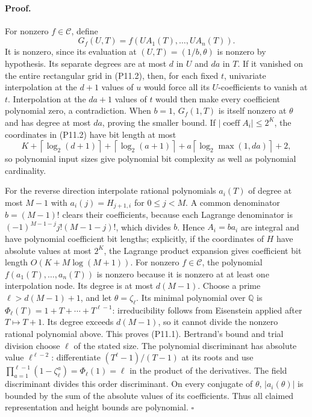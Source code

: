 \documentclass[11pt,a4paper]{article}
\theoremstyle{definition}\newtheorem{definition}{Definition}
\begin{document}
\paragraph{Proof.}
For nonzero $f\in\mathcal C$, define
\[
 G_f(U,T)=f(UA_1(T),\ldots,UA_n(T)).
\]
It is nonzero, since its evaluation at $(U,T)=(1/b,\theta)$ is nonzero by hypothesis. Its separate degrees are at most $d$ in $U$ and $da$ in $T$. If it vanished on the entire rectangular grid in (P11.2), then, for each fixed $t$, univariate interpolation at the $d+1$ values of $u$ would force all its $U$-coefficients to vanish at $t$. Interpolation at the $da+1$ values of $t$ would then make every coefficient polynomial zero, a contradiction. When $b=1$, $G_f(1,T)$ is itself nonzero at $\theta$ and has degree at most $da$, proving the smaller bound. If $|\operatorname{coeff} A_i|\le2^K$, the coordinates in (P11.2) have bit length at most
\[
 K+\left\lceil\log_2(d+1)\right\rceil
  +\left\lceil\log_2(a+1)\right\rceil
  +a\left\lceil\log_2\max(1,da)\right\rceil+2,
\]
so polynomial input sizes give polynomial bit complexity as well as polynomial cardinality.

For the reverse direction interpolate rational polynomials $a_i(T)$ of degree at most $M-1$ with $a_i(j)=H_{j+1,i}$ for $0\le j<M$. A common denominator $b=(M-1)!$ clears their coefficients, because each Lagrange denominator is $(-1)^{M-1-j}j!(M-1-j)!$, which divides $b$. Hence $A_i=ba_i$ are integral and have polynomial coefficient bit lengths; explicitly, if the coordinates of $H$ have absolute values at most $2^K$, the Lagrange product expansion gives coefficient bit length $O(K+M\log(M+1))$. For nonzero $f\in\mathcal C$, the polynomial $f(a_1(T),\ldots,a_n(T))$ is nonzero because it is nonzero at at least one interpolation node. Its degree is at most $d(M-1)$. Choose a prime $\ell>d(M-1)+1$, and let $\theta=\zeta_\ell$. Its minimal polynomial over $\mathbb Q$ is $\Phi_\ell(T)=1+T+\cdots+T^{\ell-1}$: irreducibility follows from Eisenstein applied after $T\mapsto T+1$. Its degree exceeds $d(M-1)$, so it cannot divide the nonzero rational polynomial above. This proves (P11.1). Bertrand's bound and trial division choose $\ell$ of the stated size. The polynomial discriminant has absolute value $\ell^{\ell-2}$: differentiate $(T^\ell-1)/(T-1)$ at its roots and use $\prod_{a=1}^{\ell-1}(1-\zeta_\ell^a)=\Phi_\ell(1)=\ell$ in the product of the derivatives. The field discriminant divides this order discriminant. On every conjugate of $\theta$, $|a_i(\theta)|$ is bounded by the sum of the absolute values of its coefficients. Thus all claimed representation and height bounds are polynomial. $\square$
\end{document}
